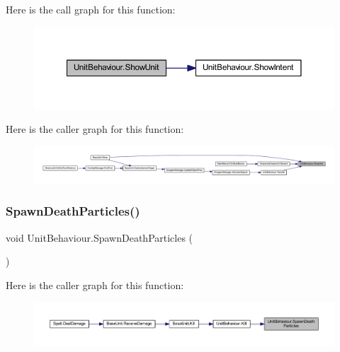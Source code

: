 Here is the call graph for this function\+:\nopagebreak
\begin{figure}[H]
\begin{center}
\leavevmode
\includegraphics[width=350pt]{class_unit_behaviour_a41b8d7f5a98e21449eafe21a31707b1d_cgraph}
\end{center}
\end{figure}
Here is the caller graph for this function\+:\nopagebreak
\begin{figure}[H]
\begin{center}
\leavevmode
\includegraphics[width=350pt]{class_unit_behaviour_a41b8d7f5a98e21449eafe21a31707b1d_icgraph}
\end{center}
\end{figure}
\mbox{\label{class_unit_behaviour_a17b46e508ee650f487d4bf79608da4eb}} 
\subsubsection{\texorpdfstring{SpawnDeathParticles()}{SpawnDeathParticles()}}
{\footnotesize\ttfamily void Unit\+Behaviour.\+Spawn\+Death\+Particles (\begin{DoxyParamCaption}{ }\end{DoxyParamCaption})}

Here is the caller graph for this function\+:\nopagebreak
\begin{figure}[H]
\begin{center}
\leavevmode
\includegraphics[width=350pt]{class_unit_behaviour_a17b46e508ee650f487d4bf79608da4eb_icgraph}
\end{center}
\end{figure}
\mbox{\label{class_unit_behaviour_a558929aaa9173e1a3b9dfecd8674660f}} 
